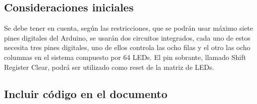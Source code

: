 \documentclass{article}
\begin{document}
\subsection{Consideraciones iniciales}
Se debe tener en cuenta, según las restricciones, que se podrán usar máximo siete pines digitales del Arduino, se usarán dos circuitos integrados, cada uno de estos necesita tres pines digitales, uno de ellos controla las ocho filas y el otro las ocho columnas en el sistema compuesto por 64 LEDs. El pin sobrante, llamado Shift Register Clear, podrá ser utilizado como reset de la matriz de LEDs.


\subsection{Incluir código en el documento}
\end{document}
